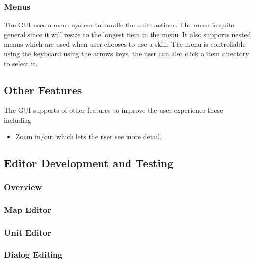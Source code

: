 
\subsubsection{Menus}

The GUI uses a menu system to handle the units actions. The menu is quite general since it will resize to the longest item in the menu.  It also supports nested menus which are used when user chooses to use a skill. The menu is controllable using the keyboard using the arrows keys, the user can also click a item directory to select it.


\subsection{Other Features}
The GUI supports of other features to improve the user experience these including

\begin{itemize}
	\item Zoom in/out which lets the user see more detail. 
\end{itemize}


\subsection{Editor Development and Testing}

\subsubsection{Overview}
\label{ssub:overview}

\subsubsection{Map Editor}
\label{ssub:map_editor}

\subsubsection{Unit Editor}
\label{ssub:unit_editors}

\clearpage
\subsubsection{Dialog Editing}
\label{ssub:dialog_editing}

